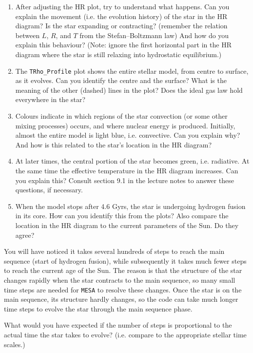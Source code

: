 \documentclass[11pt,a4paper]{article}
\begin{document}
\begin{enumerate}
\begin{enumerate}[start=2]
\item After adjusting the HR plot, try to understand what happens. Can you explain the movement (i.e. the evolution history) of the star in the HR diagram? Is the star expanding or contracting? (remember the relation between $L$, $R$, and $T$ from the Stefan–Boltzmann law) And how do you explain this behaviour? (Note: ignore the first horizontal part in the HR diagram where the star is still relaxing into hydrostatic equilibrium.)

\item The \verb|TRho_Profile| plot shows the entire stellar model, from centre to surface, as it evolves. Can you identify the centre and the surface? What is the meaning of the other (dashed) lines in the plot? Does the ideal gas law hold everywhere in the star?

\item Colours indicate in which regions of the star convection (or some other mixing processes) occurs, and where nuclear energy is produced. Initially, almost the entire model is light blue, i.e. convective. Can you explain why? And how is this related to the star's location in the HR diagram?
\item At later times, the central portion of the star becomes green, i.e. radiative. At the same time the effective temperature in the HR diagram increases. Can you explain this? Consult section 9.1 in the lecture notes to answer these questions, if necessary.

\item When the model stops after 4.6 Gyrs, the star is undergoing hydrogen fusion in its core. How can you identify this from the plots? Also compare the location in the HR diagram to the current parameters of the Sun. Do they agree?

\end{enumerate}

You will have noticed it takes several hundreds of steps to reach the main sequence (start of hydrogen fusion), while subsequently it takes much fewer steps to reach the current age of the Sun. 
The reason is that the structure of the star changes rapidly when the star contracts to the main sequence, so many small time steps are needed for \texttt{MESA} to resolve these changes. Once the star is on the main sequence, its structure hardly changes, so the code can take much longer time steps to evolve the star through the main sequence phase.

What would you have expected if the number of steps is proportional to the actual time the star takes to evolve? (i.e. compare to the appropriate stellar time scales.)


\end{enumerate}
\end{document}
